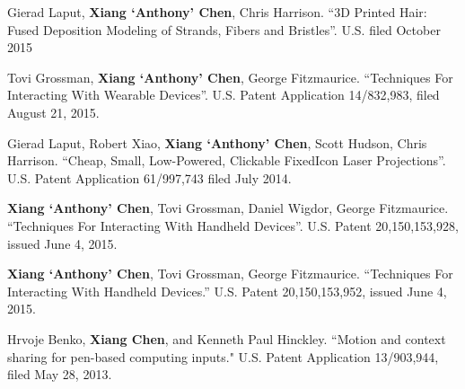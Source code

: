  {
	Gierad Laput, \textbf{Xiang ‘Anthony’ Chen}, Chris Harrison. ``3D Printed Hair: Fused Deposition Modeling of Strands, Fibers and Bristles''. U.S. filed October 2015
}

 {
	Tovi Grossman, \textbf{Xiang ‘Anthony’ Chen}, George Fitzmaurice. ``Techniques For Interacting With Wearable Devices''. U.S. Patent Application 14/832,983, filed August 21, 2015.
}

 {
	Gierad Laput, Robert Xiao, \textbf{Xiang ‘Anthony’ Chen}, Scott Hudson, Chris Harrison. ``Cheap, Small, Low-Powered, Clickable FixedIcon Laser Projections''. U.S. Patent Application 61/997,743 filed July 2014.
}

 {
	\textbf{Xiang ‘Anthony’ Chen}, Tovi Grossman, Daniel Wigdor, George Fitzmaurice. ``Techniques For Interacting With Handheld Devices''. U.S. Patent 20,150,153,928, issued June 4, 2015.
}

 {
	\textbf{Xiang ‘Anthony’ Chen}, Tovi Grossman, George Fitzmaurice. ``Techniques For Interacting With Handheld Devices.'' U.S. Patent 20,150,153,952, issued June 4, 2015.
}

 {
	Hrvoje Benko, \textbf{Xiang Chen}, and Kenneth Paul Hinckley. ``Motion and context sharing for pen-based computing inputs." U.S. Patent Application 13/903,944, filed May 28, 2013.
}